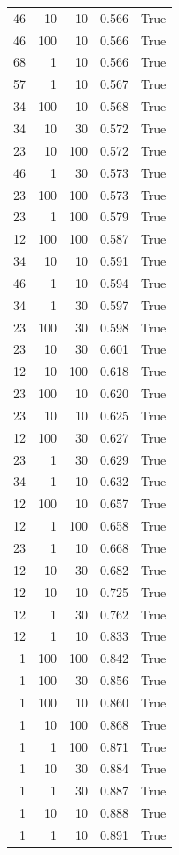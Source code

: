 \begin{tabular}{rrrrr}
46 & 10 & 10 & 0.566 & True \\
46 & 100 & 10 & 0.566 & True \\
68 & 1 & 10 & 0.566 & True \\
57 & 1 & 10 & 0.567 & True \\
34 & 100 & 10 & 0.568 & True \\
34 & 10 & 30 & 0.572 & True \\
23 & 10 & 100 & 0.572 & True \\
46 & 1 & 30 & 0.573 & True \\
23 & 100 & 100 & 0.573 & True \\
23 & 1 & 100 & 0.579 & True \\
12 & 100 & 100 & 0.587 & True \\
34 & 10 & 10 & 0.591 & True \\
46 & 1 & 10 & 0.594 & True \\
34 & 1 & 30 & 0.597 & True \\
23 & 100 & 30 & 0.598 & True \\
23 & 10 & 30 & 0.601 & True \\
12 & 10 & 100 & 0.618 & True \\
23 & 100 & 10 & 0.620 & True \\
23 & 10 & 10 & 0.625 & True \\
12 & 100 & 30 & 0.627 & True \\
23 & 1 & 30 & 0.629 & True \\
34 & 1 & 10 & 0.632 & True \\
12 & 100 & 10 & 0.657 & True \\
12 & 1 & 100 & 0.658 & True \\
23 & 1 & 10 & 0.668 & True \\
12 & 10 & 30 & 0.682 & True \\
12 & 10 & 10 & 0.725 & True \\
12 & 1 & 30 & 0.762 & True \\
12 & 1 & 10 & 0.833 & True \\
1 & 100 & 100 & 0.842 & True \\
1 & 100 & 30 & 0.856 & True \\
1 & 100 & 10 & 0.860 & True \\
1 & 10 & 100 & 0.868 & True \\
1 & 1 & 100 & 0.871 & True \\
1 & 10 & 30 & 0.884 & True \\
1 & 1 & 30 & 0.887 & True \\
1 & 10 & 10 & 0.888 & True \\
1 & 1 & 10 & 0.891 & True \\
\bottomrule
\end{tabular}
